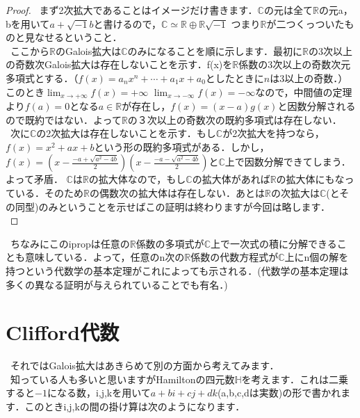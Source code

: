\documentclass{jreport}
\theoremstyle{idefinition}
\begin{document}
\begin{proof}
\ まず2次拡大であることはイメージだけ書きます．$\mathbb{C}$の元は全て$\mathbb{R}$の元a，bを用いて$a+\sqrt{-1} b$と書けるので，$\mathbb{C} \simeq \mathbb{R} \oplus \mathbb{R} \sqrt{-1}$ つまり$\mathbb{R}$が二つくっついたものと見なせるということ．\\
\ ここから$\mathbb{R}$のGalois拡大は$\mathbb{C}$のみになることを順に示します．最初に$\mathbb{R}$の3次以上の奇数次Galois拡大は存在しないことを示す．f(x)を$\mathbb{R}$係数の3次以上の奇数次元多項式とする．（$f(x)=a_nx^n+\cdots +a_1x+a_0$としたときに$n$は3以上の奇数．）このとき$\displaystyle \lim_{x \to +\infty} f(x)=+\infty$ $\displaystyle \lim_{x \to -\infty} f(x)=-\infty$なので，中間値の定理より$f(a)=0$となる$a\in \mathbb{R}$が存在し，$f(x)=(x-a)g(x)$と因数分解されるので既約ではない．よって$\mathbb{R}$の３次以上の奇数次の既約多項式は存在しない．\\
\ 次に$\mathbb{C}$の2次拡大は存在しないことを示す．もし$\mathbb{C}$が2次拡大を持つなら，$f(x)=x^2+ax+b$という形の既約多項式がある．しかし，$f(x)=(x-\frac{-a+\sqrt{a^2-4b}}{2})(x-\frac{-a-\sqrt{a^2-4b}}{2})$と$\mathbb{C}$上で因数分解できてしまう．よって矛盾． $\mathbb{C}$は$\mathbb{R}$の拡大体なので，もし$\mathbb{C}$の拡大体があれば$\mathbb{R}$の拡大体にもなっている．そのため$\mathbb{R}$の偶数次の拡大体は存在しない．あとは$\mathbb{R}$の次拡大は$\mathbb{C}$(とその同型)のみということを示せばこの証明は終わりますが今回は略します．\\
\end{proof}

\ ちなみにこのipropは任意の$\mathbb{R}$係数の多項式が$\mathbb{C}$上で一次式の積に分解できることも意味している．よって，任意のn次の$\mathbb{R}$係数の代数方程式が$\mathbb{C}$上にn個の解を持つという代数学の基本定理がこれによっても示される．(代数学の基本定理は多くの異なる証明が与えられていることでも有名．)\\


\newpage

\section{Clifford代数}

\ それではGalois拡大はあきらめて別の方面から考えてみます．\\
\ 知っている人も多いと思いますがHamiltonの四元数$\mathbb{H}$を考えます．これは二乗すると$-1$になる数，i,j,kを用いて$a+bi+cj+dk$(a,b,c,dは実数)の形で書かれます．このときi,j,kの間の掛け算は次のようになります．\\
\end{document}
